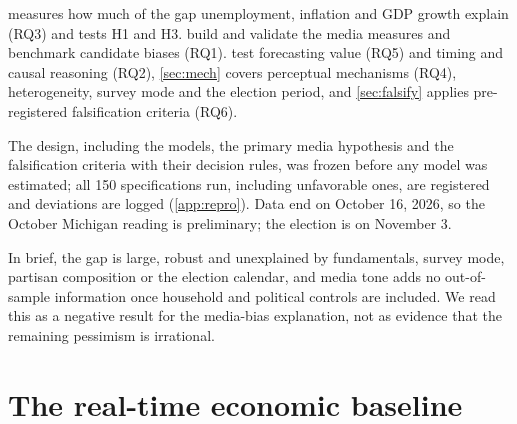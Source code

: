 \documentclass[11pt]{article}
\begin{document}
 measures how much of the gap unemployment, inflation and GDP growth explain (RQ3) and tests H1 and H3.  build and validate the media measures and benchmark candidate biases (RQ1).  test forecasting value (RQ5) and timing and causal reasoning (RQ2), \cref{sec:mech} covers perceptual mechanisms (RQ4), heterogeneity, survey mode and the election period, and \cref{sec:falsify} applies pre-registered falsification criteria (RQ6).

The design, including the models, the primary media hypothesis and the falsification criteria with their decision rules, was frozen before any model was estimated; all 150 specifications run, including unfavorable ones, are registered and deviations are logged (\cref{app:repro}). Data end on October 16, 2026, so the October Michigan reading is preliminary; the election is on November 3.

In brief, the gap is large, robust and unexplained by fundamentals, survey mode, partisan composition or the election calendar, and media tone adds no out-of-sample information once household and political controls are included. We read this as a negative result for the media-bias explanation, not as evidence that the remaining pessimism is irrational.

\section{The real-time economic baseline}\label{sec:baseline}
\end{document}
